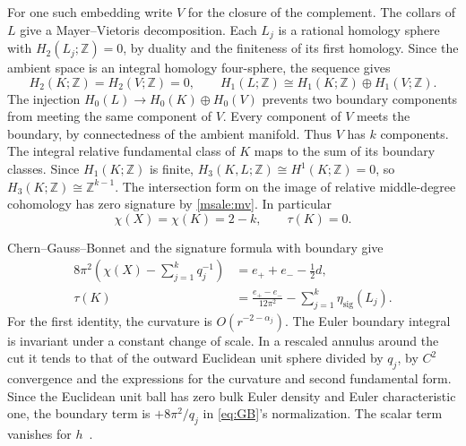 \documentclass[11pt]{article}
\numberwithin{equation}{section}
\theoremstyle{definition}
\theoremstyle{remark}
\begin{document}
For one such embedding write \(V\) for the closure of the
complement. The collars of \(L\) give a Mayer--Vietoris
decomposition. Each \(L_j\) is a rational homology sphere with
\(H_2(L_j;\mathbb Z)=0\), by duality and the finiteness of its
first homology. Since the ambient space is an integral homology
four-sphere, the sequence gives
\begin{equation}\label{msale:mv}
 H_2(K;\mathbb Z)=H_2(V;\mathbb Z)=0,\qquad
 H_1(L;\mathbb Z)\cong H_1(K;\mathbb Z)\oplus H_1(V;\mathbb Z).
\end{equation}
The injection \(H_0(L)\to H_0(K)\oplus H_0(V)\) prevents two
boundary components from meeting the same component of \(V\).
Every component of \(V\) meets the boundary, by connectedness
of the ambient manifold. Thus \(V\) has \(k\) components.
The integral relative fundamental class of \(K\) maps to the
sum of its boundary classes. Since \(H_1(K;\mathbb Z)\) is
finite, \(H_3(K,L;\mathbb Z)\cong H^1(K;\mathbb Z)=0\), so
\(H_3(K;\mathbb Z)\cong\mathbb Z^{k-1}\). The intersection form
on the image of relative
middle-degree cohomology has zero signature by
\eqref{msale:mv}. In particular
\begin{equation}\label{msale:core-topology}
 \chi(X)=\chi(K)=2-k,\qquad \tau(K)=0.
\end{equation}

Chern--Gauss--Bonnet and the signature formula with boundary give
\begin{align}
 8\pi^2\left(\chi(X)-\sum_{j=1}^k q_j^{-1}\right)
   &= e_++e_--\tfrac12d, \label{msale:ae-euler}\\
 \tau(K)
   &=\frac{e_+-e_-}{12\pi^2}
           -\sum_{j=1}^k\eta_{\mathrm{sig}}(L_j).
         \label{msale:ae-signature}
\end{align}
For the first identity, the curvature is \(O(r^{-2-\alpha_j})\).
The Euler boundary integral is invariant under a constant change
of scale. In a rescaled annulus around the cut it tends to that
of the outward Euclidean unit sphere divided by \(q_j\), by
\(C^2\) convergence and the expressions for the curvature and
second fundamental form. Since the Euclidean unit ball has zero
bulk Euler density and Euler characteristic one, the boundary
term is \(+8\pi^2/q_j\) in \eqref{eq:GB}'s normalization.
The scalar term vanishes for \(h\)~\cite[\S7, (7.2)]{TianViaclovsky2005ALE}.
\end{document}
